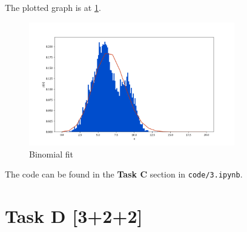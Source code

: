 The plotted graph is at \ref{fig_a3c}.

\begin{figure}[H]
    \centering
    \includegraphics[width=0.8\textwidth]{assets/images/a3c.png}
    \caption{Binomial fit}
    \label{fig_a3c}
\end{figure}

The code can be found in the \textbf{Task C} section in \texttt{code/3.ipynb}.

\section*{\colS{$\S$} Task D \hfill \normalfont \large [3+2+2]}


